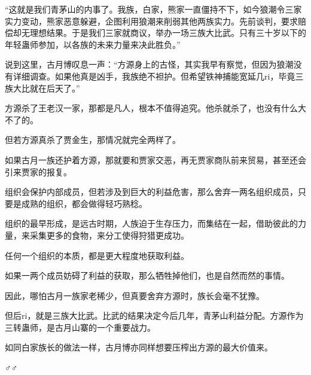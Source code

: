 \begin{this_body}
“这就是我们青茅山的内事了。我族，白家，熊家一直僵持不下，如今狼潮令三家实力变动，熊家恶意躲避，企图利用狼潮来削弱其他两族实力。先前谈判，要求赔偿却无理想结果。于是我们三家就商议，举办一场三族大比武。只有三十岁以下的年轻蛊师参加，以各族的未来力量来决此胜负。”

说到这里，古月博叹息一声：“方源身上的古怪，其实我早有察觉，但因为狼潮没有详细调查。如果他真是凶手，我族绝不袒护。但希望铁神捕能宽延几ri，毕竟三族大比就在后天了。”

方源杀了王老汉一家，那都是凡人，根本不值得追究。他杀就杀了，也没有什么大不了的。

但若方源真杀了贾金生，那情况就完全两样了。

如果古月一族还护着方源，那就要和贾家交恶，再无贾家商队前来贸易，甚至还会引来贾家的报复。

组织会保护内部成员，但若涉及到巨大的利益危害，那么舍弃一两名组织成员，只要是成熟的组织，都会做得轻巧熟稔。

组织的最早形成，是远古时期，人族迫于生存压力，而集结在一起，借助彼此的力量，来采集更多的食物，来分工使得狩猎更成功。

任何一个组织的本质，都是更大程度地获取利益。

如果一两个成员妨碍了利益的获取，那么牺牲掉他们，也是自然而然的事情。

因此，哪怕古月一族家老稀少，但真要舍弃方源时，族长会毫不犹豫。

但后ri，就是三族大比武。比武的结果决定今后几年，青茅山利益分配。方源作为三转蛊师，是古月山寨的一个重要战力。

如同白家族长的做法一样，古月博亦同样想要压榨出方源的最大价值来。

♂♂

\end{this_body}

